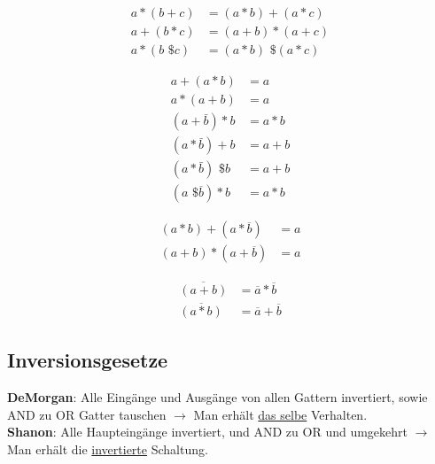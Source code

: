\begin{minipage}{0.2\textwidth}
	\begin{align*}
		a * (b + c) &= (a * b) + (a * c) \\
		a + (b * c) &= (a + b) * (a + c) \\
		a * (b \text{ \$ } c) &= (a * b) \text{ \$ } (a * c)
	\end{align*}
\end{minipage}
\begin{minipage}{0.2\textwidth}
	\begin{align*}
		a + (a * b) &= a \\
		a * (a + b) &= a \\
		(a + \bar{b}) * b &= a * b \\
		(a * \bar{b}) + b &= a + b \\
		(a * \bar{b}) \text{ \$ } b &= a + b \\
		(a \text{ \$ } \overline{b}) * b &= a * b
	\end{align*}
\end{minipage}

\begin{minipage}{0.2\textwidth}
	\begin{align*}
		(a * b) + (a * \overline{b}) &= a \\
		(a + b) * (a + \overline{b}) &= a
	\end{align*}
\end{minipage}
\begin{minipage}{0.2\textwidth}
	\begin{align*}
		\overline{(a + b)} &=  \overline{a} * \overline{b} \\
		\overline{(a * b)} &=  \overline{a} + \overline{b}
	\end{align*}
\end{minipage}

\subsection{Inversionsgesetze}
\noindent \textbf{DeMorgan}: Alle Eingänge und Ausgänge von allen Gattern invertiert, sowie AND zu OR Gatter tauschen $\rightarrow$ Man erhält \underline{das selbe} Verhalten. \\
\noindent \textbf{Shanon}: Alle Haupteingänge invertiert, und AND zu OR und umgekehrt $\rightarrow$ Man erhält die \underline{invertierte} Schaltung.

